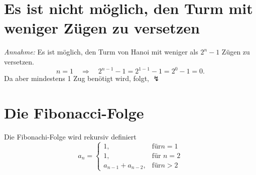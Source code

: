 \documentclass{article}
\begin{document}
		\section*{\small Es ist nicht möglich, den Turm mit weniger Zügen zu versetzen}
		\vspace{-2mm}
	\textit{Annahme:} Es ist möglich, den Turm von Hanoi mit weniger als \( 2^n - 1 \) Zügen zu versetzen.  
	 	\vspace{-5pt}
		\[
		n = 1 \quad \Rightarrow \quad 2^{n-1} - 1 = 2^{1-1} - 1 = 2^0 - 1 = 0.
		\]
		Da aber mindestens 1 Zug benötigt wird, folgt, $ \lightning $
	
		\section*{Die Fibonacci-Folge}
		
		Die Fibonachi-Folge wird rekursiv definiert
		\[
		a_n = 
		\begin{cases} 
			1, & \text{für} n = 1 \\
			1, & \text{für } n = 2 \\
			a_{n-1} + a_{n-2}, & \text{für} n > 2
		\end{cases}
		\]
\end{document}
